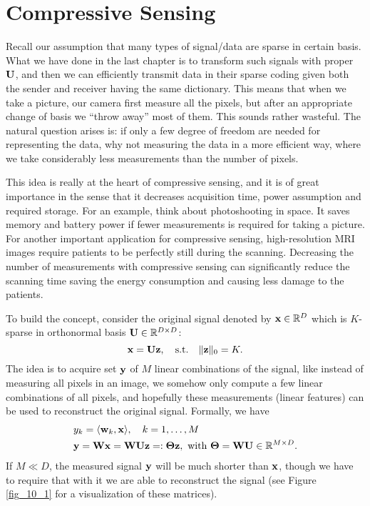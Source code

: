 \documentclass[../main.tex]{subfiles}
\begin{document}
\section{Compressive Sensing}
Recall our assumption that many types of signal/data are sparse in certain basis. What we have done in the last chapter is to transform such signals with proper ${\bf U}$, and then we can efficiently transmit data in their sparse coding given both the sender and receiver having the same dictionary. This means that when we take a picture, our camera first measure all the pixels, but after an appropriate change of basis we ``throw away'' most of them. This sounds rather wasteful. The natural question arises is: if only a few degree of freedom are needed for representing the data, why not measuring the data in a more efficient way, where we take considerably less measurements than the number of pixels. 
\par This idea is really at the heart of compressive sensing, and it is of great importance in the sense that it decreases acquisition time, power assumption and required storage. For an example, think about photoshooting in space. It saves memory and battery power if fewer measurements is required for taking a picture. For another important application for compressive sensing, high-resolution MRI images require patients to be perfectly still during the scanning. Decreasing the number of measurements with compressive sensing can significantly reduce the scanning time saving the energy consumption and causing less damage to the patients.
\par To build the concept, consider the original signal denoted by ${\bf x}\in \mathbb{R}^D$ which is $K$-sparse in orthonormal basis ${\bf U}\in\mathbb{R}^{D\times D}$:
\begin{equation*}
{\bf x}={\bf Uz},\quad {\rm s.t.}\quad \|{\bf z}\|_0=K.
\end{equation*}
The idea is to acquire set ${\bf y}$ of $M$ linear combinations of the signal, like instead of measuring all pixels in an image, we somehow only compute a few linear combinations of all pixels, and hopefully these measurements (linear features) can be used to reconstruct the original signal. Formally, we have
\begin{align*}
&y_k=\langle {\bf w}_k,{\bf x}\rangle,\quad k=1,\dots,M\\
&{\bf y}={\bf Wx}={\bf WUz}=:{\bf \Theta z},\ {\rm with}\ {\bf \Theta}={\bf WU}\in\mathbb{R}^{M\times D}.
\end{align*}
If $M\ll D$, the measured signal ${\bf y}$ will be much shorter than ${\bf x}$, though we have to require that with it we are able to reconstruct the signal (see Figure \ref{fig_10_1} for a visualization of these matrices).
\end{document}
